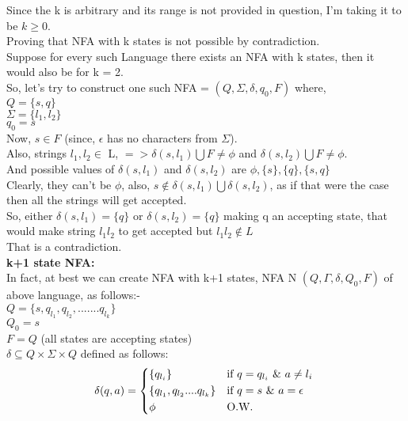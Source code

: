 \documentclass{article}
\begin{document}
\begin{enumerate}
Since the k is arbitrary and its range is not provided in question, I'm taking it to be $k \geq 0$.\\
Proving that NFA with k states is not possible by contradiction.\\
Suppose for every such Language there exists an NFA with k states, then it would also be for k = 2.\\
So, let's try to construct one such NFA = {$(Q, \Sigma, \delta, q_0 , F )$} where,\\
$Q = \{s, q\}$\\
$\Sigma = \{l_1, l_2 \}$\\
$q_0 = s$\\
Now, $s \in F$ (since, $\epsilon $ has no characters from $\Sigma $).\\
Also, strings $l_1, l_2 \in $ L, $=> \delta(s,l_1) \bigcup F \neq \phi $ and $ \delta(s,l_2)  \bigcup F \neq \phi$.\\
And possible values of $ \delta(s,l_1) $ and $ \delta(s,l_2)$ are $\phi, \{s\}, \{q\}, \{s,q\}$\\
Clearly, they can't be $\phi$, also, $s \notin \delta(s,l_1) \bigcup \delta(s,l_2) $, as if that were the case then all the 
strings will get accepted. \\
So, either $ \delta(s,l_1) = \{q\}$ or $ \delta(s,l_2) = \{q\}$ making q an accepting state, that would make string $l_1l_2$ to get accepted 
but $l_1l_2 \notin L$\\
That is a contradiction.\\

\textbf{k+1 state NFA: }\\
In fact, at best we can create NFA with k+1 states, NFA N $(Q, \Gamma, \delta, Q_0 , F )$ of above language, as follows:- \\
$Q =  \{s, q_{l_1}, q_{l_2}, ....... q_{l_k}\}$\\
$Q_0 = s$\\
$F = Q$ (all states are accepting states)\\
$\delta \subseteq Q \times \Sigma \times Q$ defined as follows:\\

\begin{equation}
    \delta (q,a) = 
    \begin{cases*}
      \{q_{l_i}\} & if $ q = q_{l_i} \text{ } \& \text{ } a \neq l_i$ \\
      \{q_{l_1}, q_{l_2} .... q_{l_k}\} & if $ q = s \text{ } \& \text{ }a = \epsilon$\\
      \phi & O.W.
    \end{cases*}
\end{equation}



\end{enumerate}
\end{document}
